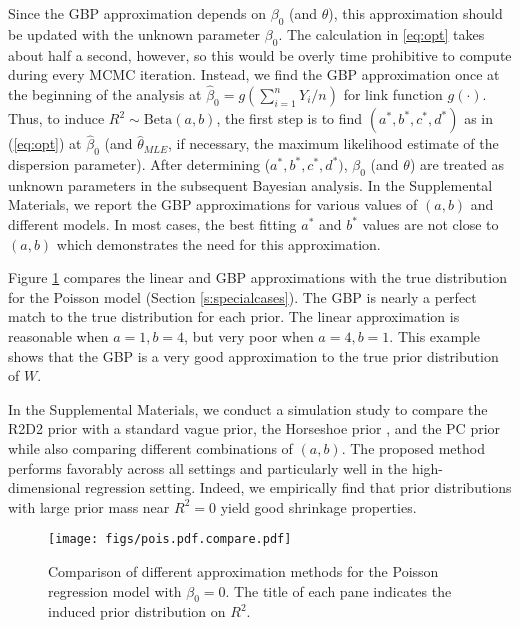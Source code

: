 \documentclass[12pt]{article}
\begin{document}
Since the GBP approximation depends on $\beta_0$ (and $\theta$), this approximation should be updated with the unknown parameter $\beta_0$. The calculation in \eqref{eq:opt} takes about half a second, however, so this would be overly time prohibitive to compute during every MCMC iteration. Instead, we find the GBP approximation once at the beginning of the analysis at $\hat\beta_0=g(\sum_{i=1}^nY_i/n)$ for link function $g(\cdot)$. %
Thus, to induce $R^2\sim\mbox{Beta}(a,b)$, the first step is to find $(a^*,b^*,c^*,d^*)$ as in (\ref{eq:opt}) at $\hat\beta_0$ (and $\hat\theta_{MLE}$, if necessary, the maximum likelihood estimate of the dispersion parameter). After determining ($a^*,b^*,c^*,d^*)$, $\beta_0$ (and $\theta$) are treated as unknown parameters in the subsequent Bayesian analysis. In the Supplemental Materials, we report the GBP approximations for various values of $(a,b)$ and different models. In most cases, the best fitting $a^*$ and $b^*$ values are not close to $(a,b)$ which demonstrates the need for this approximation.

Figure \ref{fig:pdf_compare} compares the linear and GBP approximations with the true distribution for the Poisson model (Section \ref{s:specialcases}). The GBP is nearly a perfect match to the true distribution for each prior. The linear approximation is reasonable when $a=1,b=4$, but very poor when $a=4,b=1$. This example shows that the GBP is a very good approximation to the true prior distribution of $W$.

In the Supplemental Materials, we conduct a simulation study to compare the R2D2 prior with a standard vague prior, the Horseshoe prior \citep{carvalho2009handling}, and the PC prior \citep{simpson2017penalising} while also comparing different combinations of $(a,b)$. The proposed method performs favorably across all settings and particularly well in the high-dimensional regression setting. Indeed, we empirically find that prior distributions with large prior mass near $R^2=0$ yield good shrinkage properties.


\begin{figure}
    \centering
    {\texttt{[image: figs/pois.pdf.compare.pdf]}}
    \caption{Comparison of different approximation methods for the Poisson regression model with $\beta_0=0$. The title of each pane indicates the induced prior distribution on $R^2$.}
    \label{fig:pdf_compare}
\end{figure}
\end{document}
